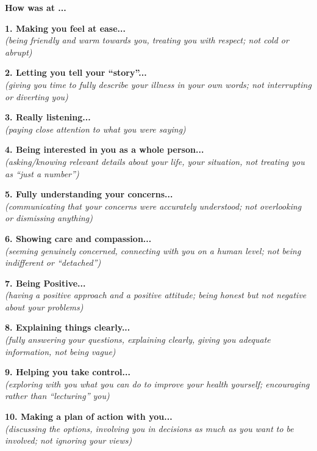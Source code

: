 \begin{small}

	\begin{tcolorbox}[boxrule=1pt]
		\begin{center}
			{\large \textbf{How was \sysname at ...}}
		\end{center}

	\end{tcolorbox}

	\vspace{1em}


	\noindent \textbf{1. Making you feel at ease...} \\
	\textit{(being friendly and warm towards you, treating you with respect; not cold or abrupt)}
	\ratingTable

	\noindent \textbf{2. Letting you tell your ``story''...} \\
	\textit{(giving you time to fully describe your illness in your own words; not interrupting or diverting you)}
	\ratingTable

	\noindent \textbf{3. Really listening...} \\
	\textit{(paying close attention to what you were saying)}
	\ratingTable

	\noindent \textbf{4. Being interested in you as a whole person...} \\
	\textit{(asking/knowing relevant details about your life, your situation, not treating you as ``just a number'')}
	\ratingTable


	\noindent \textbf{5. Fully understanding your concerns...} \\
	\textit{(communicating that your concerns were accurately understood; not overlooking or dismissing anything)}
	\ratingTable

	\noindent \textbf{6. Showing care and compassion...} \\
	\textit{(seeming genuinely concerned, connecting with you on a human level; not being indifferent or ``detached'')}
	\ratingTable

	\noindent \textbf{7. Being Positive...} \\
	\textit{(having a positive approach and a positive attitude; being honest but not negative about your problems)}
	\ratingTable

	\noindent \textbf{8. Explaining things clearly...} \\
	\textit{(fully answering your questions, explaining clearly, giving you adequate information, not being vague)}
	\ratingTable

	\noindent \textbf{9. Helping you take control...} \\
        \textit{(exploring with you what you can do to improve your health yourself; encouraging rather than ``lecturing'' you)}
	\ratingTable

	\noindent \textbf{10. Making a plan of action with you...} \\
	\textit{(discussing the options, involving you in decisions as much as you want to be involved; not ignoring your views)}
	\ratingTable
\end{small}

